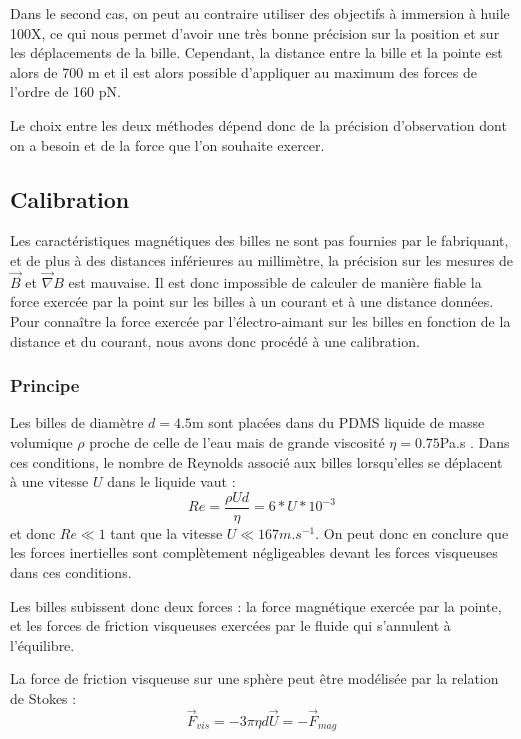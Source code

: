 		 Dans le second cas, on peut au contraire utiliser des objectifs à immersion à huile 100X, ce qui nous permet d'avoir une très bonne précision sur la position et sur les déplacements de la bille. Cependant, la distance entre la bille et la pointe est alors de 700 \micro m et il est alors possible d'appliquer au maximum des forces de l'ordre de 160 pN. 
		 
Le choix entre les deux méthodes dépend donc de la précision d'observation dont on a besoin et de la force que l'on souhaite exercer. 

		 
		 
		 		 
		  
		
		
	\subsection{Calibration}
  
 Les caractéristiques magnétiques des billes ne sont pas fournies par le fabriquant, et de plus à des distances inférieures au millimètre, la précision sur les mesures de $\vec{B}$ et $\vec{\nabla}B$ est mauvaise. 
 Il est donc impossible de calculer de manière fiable la force exercée par la point sur les billes à un courant et à une distance données.
 Pour connaître la force exercée par l'électro-aimant sur les billes en fonction de la distance et du courant, nous avons donc procédé à une calibration.
 
 \subsubsection{Principe}
 
 Les billes de diamètre $d=4.5$\micro m sont placées dans du PDMS liquide de masse volumique $\rho$ proche de celle de l'eau mais de grande viscosité $\eta=0.75$Pa.s . 
 Dans ces conditions, le nombre de Reynolds associé aux billes lorsqu'elles se déplacent à une vitesse $U$ dans le liquide vaut : $$Re = \frac{\rho U d }{\eta}=6*U*10^{-3}$$
 et donc $Re \ll 1$ tant que la vitesse $U \ll 167 m.s^{-1}$. 
 On peut donc en conclure que les forces inertielles sont complètement négligeables devant les forces visqueuses dans ces conditions. 
 
 Les billes subissent donc deux forces : la force magnétique exercée par la pointe, et les forces de friction visqueuses exercées par le fluide qui s'annulent à l'équilibre. 
 
 La force de friction visqueuse sur une sphère peut être modélisée par la relation de Stokes : 
 $$ \vec{F}_{vis}=- 3 \pi \eta d \vec{U} =-\vec{F}_{mag}$$
 
